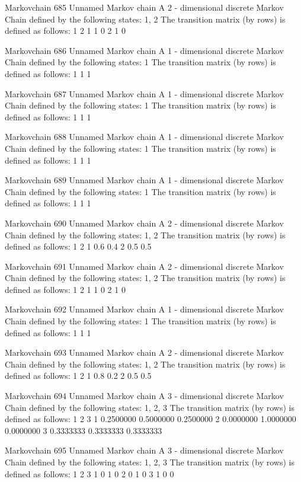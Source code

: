 \documentclass[
  nojss]{jss}
\begin{document}
\begin{CodeChunk}
\begin{CodeOutput}
Markovchain  685 
Unnamed Markov chain 
 A  2 - dimensional discrete Markov Chain defined by the following states: 
 1, 2 
 The transition matrix  (by rows)  is defined as follows: 
  1 2
1 1 0
2 1 0

Markovchain  686 
Unnamed Markov chain 
 A  1 - dimensional discrete Markov Chain defined by the following states: 
 1 
 The transition matrix  (by rows)  is defined as follows: 
  1
1 1

Markovchain  687 
Unnamed Markov chain 
 A  1 - dimensional discrete Markov Chain defined by the following states: 
 1 
 The transition matrix  (by rows)  is defined as follows: 
  1
1 1

Markovchain  688 
Unnamed Markov chain 
 A  1 - dimensional discrete Markov Chain defined by the following states: 
 1 
 The transition matrix  (by rows)  is defined as follows: 
  1
1 1

Markovchain  689 
Unnamed Markov chain 
 A  1 - dimensional discrete Markov Chain defined by the following states: 
 1 
 The transition matrix  (by rows)  is defined as follows: 
  1
1 1

Markovchain  690 
Unnamed Markov chain 
 A  2 - dimensional discrete Markov Chain defined by the following states: 
 1, 2 
 The transition matrix  (by rows)  is defined as follows: 
    1   2
1 0.6 0.4
2 0.5 0.5

Markovchain  691 
Unnamed Markov chain 
 A  2 - dimensional discrete Markov Chain defined by the following states: 
 1, 2 
 The transition matrix  (by rows)  is defined as follows: 
  1 2
1 1 0
2 1 0

Markovchain  692 
Unnamed Markov chain 
 A  1 - dimensional discrete Markov Chain defined by the following states: 
 1 
 The transition matrix  (by rows)  is defined as follows: 
  1
1 1

Markovchain  693 
Unnamed Markov chain 
 A  2 - dimensional discrete Markov Chain defined by the following states: 
 1, 2 
 The transition matrix  (by rows)  is defined as follows: 
    1   2
1 0.8 0.2
2 0.5 0.5

Markovchain  694 
Unnamed Markov chain 
 A  3 - dimensional discrete Markov Chain defined by the following states: 
 1, 2, 3 
 The transition matrix  (by rows)  is defined as follows: 
          1         2         3
1 0.2500000 0.5000000 0.2500000
2 0.0000000 1.0000000 0.0000000
3 0.3333333 0.3333333 0.3333333

Markovchain  695 
Unnamed Markov chain 
 A  3 - dimensional discrete Markov Chain defined by the following states: 
 1, 2, 3 
 The transition matrix  (by rows)  is defined as follows: 
  1 2 3
1 0 1 0
2 0 1 0
3 1 0 0


\end{CodeOutput}
\end{CodeChunk}
\end{document}
